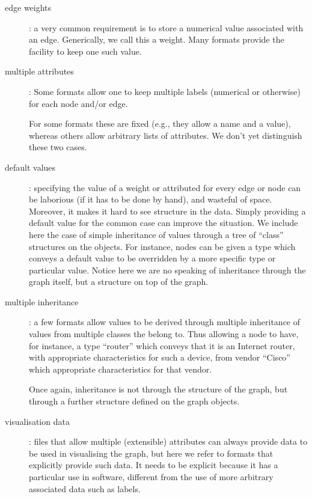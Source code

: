 \documentclass{sig-alternate}
\begin{document}
\begin{description}

\item[edge weights]: a very common requirement is to store a numerical
  value associated with an edge. Generically, we call this a
  weight. Many formats provide the facility to keep one such value.

\item[multiple attributes]: Some formats allow one to keep multiple
  labels (numerical or otherwise) for each node and/or edge. 

  For some formats these are fixed (e.g., they allow a name and a
  value), whereas others allow arbitrary lists of attributes. We don't
  yet distinguish these two cases. 

\item[default values]: specifying the value of a weight or attributed
  for every edge or node can be laborious (if it has to be done by
  hand), and wasteful of space. Moreover, it makes it hard to see
  structure in the data. Simply providing a default value for the
  common case can improve the situation. We include here the case of
  simple inheritance of values through a tree of ``class'' structures
  on the objects. For instance, nodes can be given a type which
  conveys a default value to be overridden by a more specific type or
  particular value. Notice here we are no speaking of inheritance
  through the graph itself, but a structure on top of the graph.

\item[multiple inheritance]: a few formats allow values to be derived
  through multiple inheritance of values from multiple classes the
  belong to. Thus allowing a node to have, for instance, a type
  ``router'' which conveys that it is an Internet router, with
  appropriate characteristics for such a device, from vendor ``Cisco''
  which appropriate characteristics for that vendor.
  
  Once again, inheritance is not through the structure of the graph,
  but through a further structure defined on the graph objects. 

\item[visualisation data]: files that allow multiple (extensible)
  attributes can always provide data to be used in visualising the
  graph, but here we refer to formats that explicitly provide such
  data. It needs to be explicit because it has a particular use in
  software, different from the use of more arbitrary associated data
  such as labels. 


\end{description}
\end{document}
